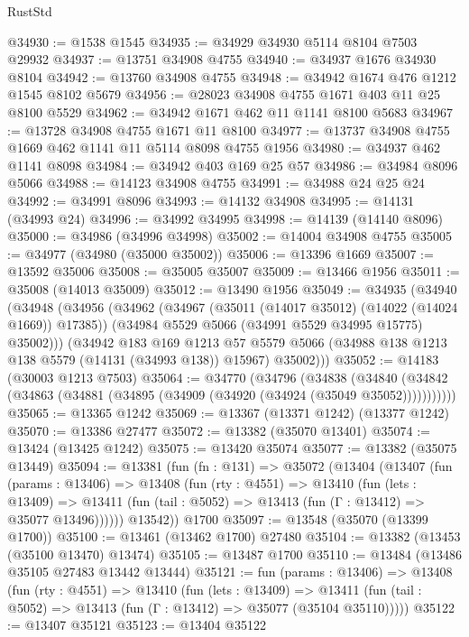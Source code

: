\begin{lexlean}{RustStd}
\begin{coremodule}
@34930 := @1538 @1545
@34935 := @34929 @34930 @5114 @8104 @7503 @29932
@34937 := @13751 @34908 @4755
@34940 := @34937 @1676 @34930 @8104
@34942 := @13760 @34908 @4755
@34948 := @34942 @1674 @476 @1212 @1545 @8102 @5679
@34956 := @28023 @34908 @4755 @1671 @403 @11 @25 @8100 @5529
@34962 := @34942 @1671 @462 @11 @1141 @8100 @5683
@34967 := @13728 @34908 @4755 @1671 @11 @8100
@34977 := @13737 @34908 @4755 @1669 @462 @1141 @11 @5114 @8098 @4755 @1956
@34980 := @34937 @462 @1141 @8098
@34984 := @34942 @403 @169 @25 @57
@34986 := @34984 @8096 @5066
@34988 := @14123 @34908 @4755
@34991 := @34988 @24 @25 @24
@34992 := @34991 @8096
@34993 := @14132 @34908
@34995 := @14131 (@34993 @24)
@34996 := @34992 @34995
@34998 := @14139 (@14140 @8096)
@35000 := @34986 (@34996 @34998)
@35002 := @14004 @34908 @4755
@35005 := @34977 (@34980 (@35000 @35002))
@35006 := @13396 @1669
@35007 := @13592 @35006
@35008 := @35005 @35007
@35009 := @13466 @1956
@35011 := @35008 (@14013 @35009)
@35012 := @13490 @1956
@35049 := @34935
    (@34940
      (@34948
        (@34956
          (@34962
            (@34967 (@35011 (@14017 @35012) (@14022 (@14024 @1669)) @17385))
            (@34984 @5529 @5066 (@34991 @5529 @34995 @15775) @35002)))
        (@34942
          @183
          @169
          @1213
          @57
          @5579
          @5066
          (@34988 @138 @1213 @138 @5579 (@14131 (@34993 @138)) @15967)
          @35002)))
@35052 := @14183 (@30003 @1213 @7503)
@35064 := @34770
    (@34796
      (@34838
        (@34840 (@34842 (@34863 (@34881 (@34895 (@34909 (@34920 (@34924 (@35049 @35052)))))))))))
@35065 := @13365 @1242
@35069 := @13367 (@13371 @1242) (@13377 @1242)
@35070 := @13386 @27477
@35072 := @13382 (@35070 @13401)
@35074 := @13424 (@13425 @1242)
@35075 := @13420 @35074
@35077 := @13382 (@35075 @13449)
@35094 := @13381
    (fun (fn : @131) =>
    @35072
      (@13404
        (@13407
          (fun (params : @13406) =>
          @13408
            (fun (rty : @4551) =>
            @13410
              (fun (lets : @13409) =>
              @13411 (fun (tail : @5052) => @13413 (fun (Γ : @13412) => @35077 @13496))))))
        @13542))
    @1700
@35097 := @13548 (@35070 (@13399 @1700))
@35100 := @13461 (@13462 @1700) @27480
@35104 := @13382 (@13453 (@35100 @13470) @13474)
@35105 := @13487 @1700
@35110 := @13484 (@13486 @35105 @27483 @13442 @13444)
@35121 := fun (params : @13406) =>
  @13408
    (fun (rty : @4551) =>
    @13410
      (fun (lets : @13409) =>
      @13411 (fun (tail : @5052) => @13413 (fun (Γ : @13412) => @35077 (@35104 @35110)))))
@35122 := @13407 @35121
@35123 := @13404 @35122

\end{coremodule}
\end{lexlean}
